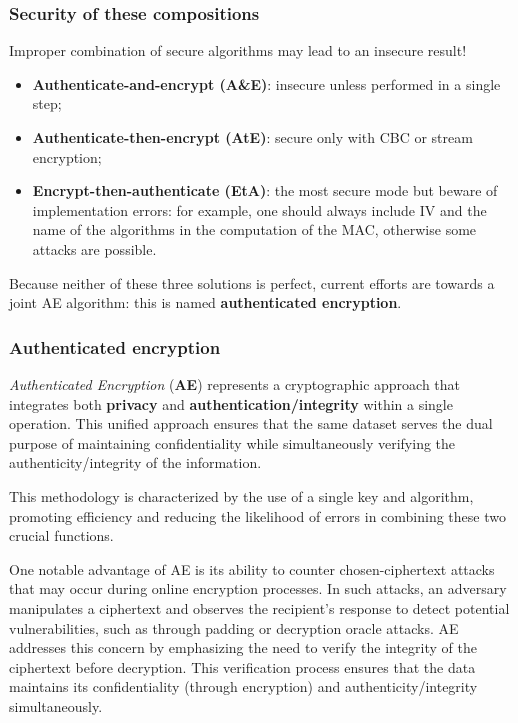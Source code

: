 \subsubsection{Security of these compositions}
Improper combination of secure algorithms may lead to an insecure result!
\begin{itemize}
    \item \textbf{Authenticate-and-encrypt (A\&E)}: insecure unless performed in a single step;
    \item \textbf{Authenticate-then-encrypt (AtE)}: secure only with CBC or stream encryption;
    \item \textbf{Encrypt-then-authenticate (EtA)}: the most secure mode but beware of implementation errors: for example, one should always include IV and the name of the algorithms in the computation of the MAC, otherwise some attacks are possible.
\end{itemize}
Because neither of these three solutions is perfect, current efforts are towards a joint AE algorithm: this is named \textbf{authenticated encryption}.


\subsubsection*{Authenticated encryption}\label{chap:ae}

\textit{Authenticated Encryption} (\textbf{AE}) represents a cryptographic approach that integrates both \textbf{privacy} and \textbf{authentication/integrity} within a single operation.
This unified approach ensures that the same dataset serves the dual purpose of maintaining confidentiality while simultaneously verifying the authenticity/integrity of the information.

This methodology is characterized by the use of a single key and algorithm, promoting efficiency and reducing the likelihood of errors in combining these two crucial functions.

One notable advantage of AE is its ability to counter chosen-ciphertext attacks that may occur during online encryption processes. In such attacks, an adversary manipulates a ciphertext and observes the recipient's response to detect potential vulnerabilities, such as through padding or decryption oracle attacks. AE addresses this concern by emphasizing the need to verify the integrity of the ciphertext before decryption. This verification process ensures that the data maintains its confidentiality (through encryption) and authenticity/integrity simultaneously.


